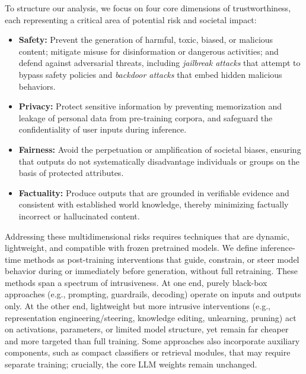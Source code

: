 To structure our analysis, we focus on four core dimensions of trustworthiness, each representing a critical area of potential risk and societal impact:

\begin{itemize}
    \item \textbf{Safety:} Prevent the generation of harmful, toxic, biased, or malicious content; mitigate misuse for disinformation or dangerous activities; and defend against adversarial threats, including \emph{jailbreak attacks} that attempt to bypass safety policies and \emph{backdoor attacks} that embed hidden malicious behaviors.
    \item \textbf{Privacy:} Protect sensitive information by preventing memorization and leakage of personal data from pre-training corpora, and safeguard the confidentiality of user inputs during inference.
    \item \textbf{Fairness:} Avoid the perpetuation or amplification of societal biases, ensuring that outputs do not systematically disadvantage individuals or groups on the basis of protected attributes.
    \item \textbf{Factuality:} Produce outputs that are grounded in verifiable evidence and consistent with established world knowledge, thereby minimizing factually incorrect or hallucinated content.
\end{itemize}

Addressing these multidimensional risks requires techniques that are dynamic, lightweight, and compatible with frozen pretrained models. We define inference-time methods as post-training interventions that guide, constrain, or steer model behavior during or immediately before generation, without full retraining. These methods span a spectrum of intrusiveness. At one end, purely black-box approaches (e.g., prompting, guardrails, decoding) operate on inputs and outputs only. At the other end, lightweight but more intrusive interventions (e.g., representation engineering/steering, knowledge editing, unlearning, pruning) act on activations, parameters, or limited model structure, yet remain far cheaper and more targeted than full training. Some approaches also incorporate auxiliary components, such as compact classifiers or retrieval modules, that may require separate training; crucially, the core LLM weights remain unchanged.

